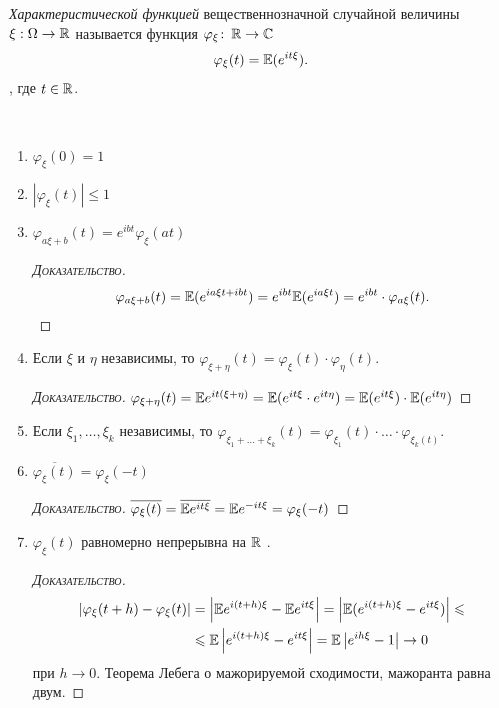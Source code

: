 \documentclass[../main.tex]{subfiles}
\begin{document}
\begin{df}
 \textit{Характеристической функцией} вещественнозначной случайной величины $ \xi : \Omega \to \mathbb{R} $ называется функция $ \varphi_\xi \colon\, \mathbb{R} \to \mathbb{C} $
 \begin{align*}
  \varphi_\xi(t) = \mathbb E ( e^{it\xi} ).
 \end{align*}, где $ t \in \mathbb{R} $.
\end{df}
\begin{prop}\
 \begin{enumerate}
  \item $ \varphi_{\xi}(0) = 1 $
  \item $ \left|\varphi_\xi(t) \right| \leqslant 1 $
  \item $ \varphi_{a\xi + b}(t) = e^{ibt}\varphi_\xi(at) $
   \begin{proof}[\normalfont\textsc{Доказательство}]
    \begin{align*}
     \varphi_{a\xi+b}(t) = \mathbb E (e^{ia\xi t + ibt}) = e^{ibt} \mathbb E(e^{ia\xi t}) = e^{ibt} \cdot \varphi_{a\xi}(t).
    \end{align*}
   \end{proof}
  \item Если $ \xi $ и $ \eta $ независимы, то $ \varphi_{\xi + \eta}(t) = \varphi_\xi(t) \cdot \varphi_\eta(t) $.
   \begin{proof}[\normalfont\textsc{Доказательство}]
    $ \varphi_{\xi+\eta}(t) = \mathbb E e^{it(\xi + \eta)} = \mathbb E (e^{it\xi} \cdot e^{it\eta}) = \mathbb E(e^{it\xi}) \cdot \mathbb E(e^{it\eta})$ 
   \end{proof}
  \item Если $ \xi_1, \ldots, \xi_k $ независимы, то $ \varphi_{\xi_1 + \ldots + \xi_k}(t) = \varphi_{\xi_1}(t) \cdot \ldots \cdot \varphi_{\xi_k(t)} $.
  \item $ \overline{\varphi_\xi(t)} = \varphi_\xi(-t) $
   \begin{proof}[\normalfont\textsc{Доказательство}]
	   $\overline{\varphi_\xi (t)} = \overline{\mathbb E e^{it\xi}} = \mathbb E e^{-it\xi} = \varphi_\xi(-t)$ 
   \end{proof}
  \item $ \varphi_\xi(t) $ равномерно непрерывна на $\mathbb{R}$ .
   \begin{proof}[\normalfont\textsc{Доказательство}]
    \begin{align*}
     \left| \varphi_\xi(t + h) - \varphi_\xi(t) \right| &= \left|\mathbb E e^{i(t+h)\xi} - \mathbb E e^{it\xi} \right| = \left| \mathbb E (e^{i(t+h)\xi} - e^{it\xi}) \right| \leqslant \\
     &\leqslant \mathbb E \left| e^{i(t+h)\xi} - e^{it\xi} \right| = \mathbb E \left| e^{ih\xi} - 1 \right| \to 0
    \end{align*} при $ h \to 0 $. Теорема Лебега о мажорируемой сходимости, мажоранта равна двум.
   \end{proof}
 \end{enumerate}
\end{prop}
\end{document}
